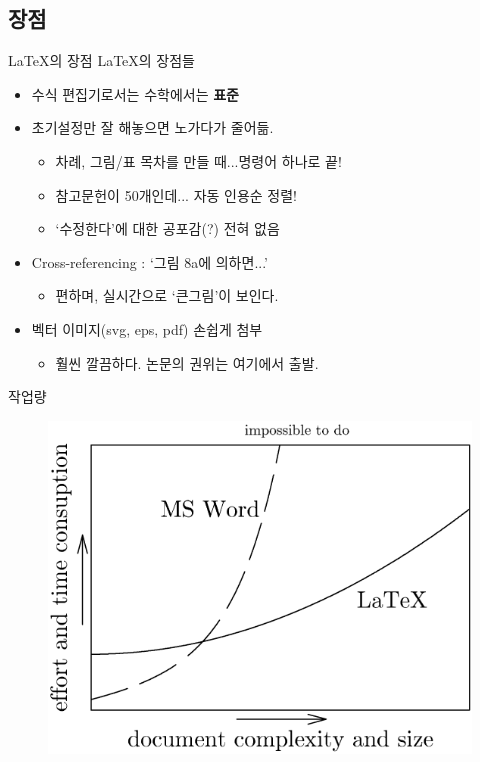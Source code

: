 \documentclass[12pt]{beamer}
\begin{document}
\subsection{장점}
\begin{frame}{\LaTeX 의 장점}
	\LaTeX 의 장점들
	\begin{itemize}
		\item 수식 편집기로서는 수학에서는 \textbf{표준}
		\item 초기설정만 잘 해놓으면 노가다가 줄어듦.
		\begin{itemize}
			\item 차례, 그림/표 목차를 만들 때...명령어 하나로 끝!
			\item 참고문헌이 50개인데... 자동 인용순 정렬!
			\item `수정한다'에 대한 공포감(?) 전혀 없음
		\end{itemize}
		\item Cross-referencing : `그림 8a에 의하면...'
		\begin{itemize}
			\item 편하며, 실시간으로 `큰그림'이 보인다. 
		\end{itemize}
		\item 벡터 이미지(svg, eps, pdf) 손쉽게 첨부
		\begin{itemize}
			\item 훨씬 깔끔하다. 논문의 권위는 여기에서 출발.
		\end{itemize}
	\end{itemize}
\end{frame}
\begin{frame}{작업량}
	\begin{figure}[h]
		\centering
		\includegraphics[width=\textwidth]{msword_vs_latex.png}
	\end{figure}
\end{frame}
\end{document}
